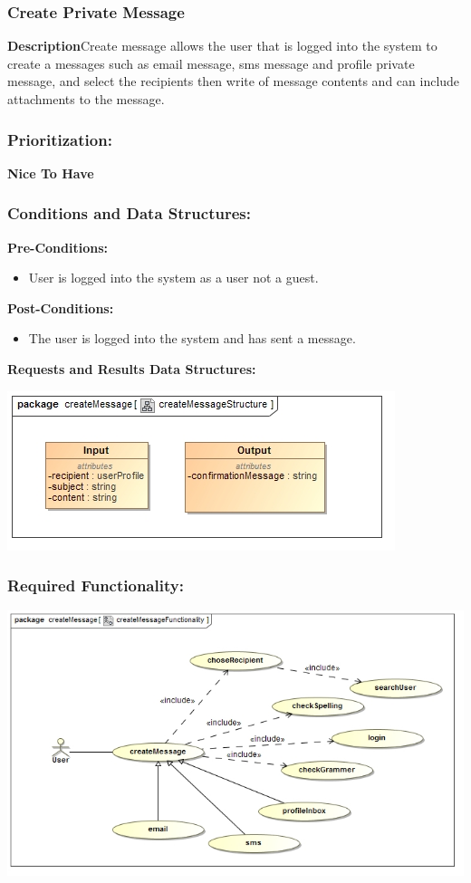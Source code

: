 \documentclass[a4paper,11pt]{article}
\begin{document}
\subsubsection{Create Private Message}
\textbf{Description}Create message allows the user that is logged into the system to create a messages such as email message, sms message and profile private message, and select the recipients then write of message contents and can include attachments to the message. 
\subsubsection{Prioritization:} 
\textbf{Nice To Have}
\subsubsection{Conditions and Data Structures:}
\textbf{Pre-Conditions:}
\begin{itemize}
\item User is logged into the system as a user not a guest. 
\end{itemize}
\textbf{Post-Conditions:}
\begin{itemize}
\item The user is logged into the system and has sent a message.
\end{itemize}
\textbf{Requests and Results Data Structures:}
\begin{center}
\includegraphics[width=1\linewidth]{./Images/PrivateMessage/createMessageStructure}
\end{center}
\subsubsection{Required Functionality:} 
\includegraphics[width=1\linewidth]{./Images/PrivateMessage/createMessageFunctionality}
\end{document}
